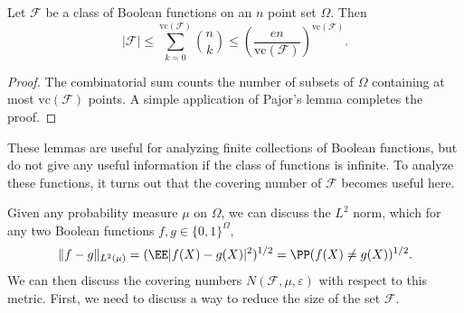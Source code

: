 \begin{theorem}
	Let $\mathcal{F}$ be a class of Boolean functions on an $n$ point set $\Omega$. Then
	\[ |\mathcal{F}| \leq \sum_{k = 0}^{\text{vc}(\mathcal{F})} {n \choose k} \leq \left( \frac{en}{\text{vc}(\mathcal{F})} \right)^{\text{vc}(\mathcal{F})}. \]
\end{theorem}
\begin{proof}
	The combinatorial sum counts the number of subsets of $\Omega$ containing at most $\text{vc}(\mathcal{F})$ points. A simple application of Pajor's lemma completes the proof.
\end{proof}

These lemmas are useful for analyzing finite collections of Boolean functions, but do not give any useful information if the class of functions is infinite. To analyze these functions, it turns out that the covering number of $\mathcal{F}$ becomes useful here.

Given any probability measure $\mu$ on $\Omega$, we can discuss the $L^2$ norm, which for any two Boolean functions $f,g \in \{ 0, 1 \}^\Omega$,
%
\[ \| f - g \|_{L^2(\mu)} = (\EE |f(X) - g(X)|^2)^{1/2} = \PP(f(X) \neq g(X))^{1/2}. \]
%
We can then discuss the covering numbers $N(\mathcal{F},\mu,\varepsilon)$ with respect to this metric. First, we need to discuss a way to reduce the size of the set $\mathcal{F}$.

